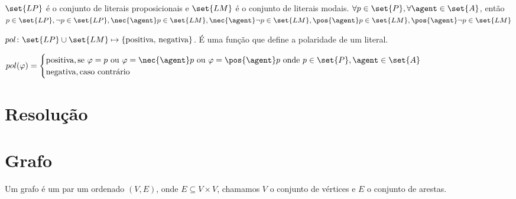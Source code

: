 
\begin{definition}
$\set{LP}$ é o conjunto de literais proposicionais e $\set{LM}$ é o conjunto de literais modais.
$\forall p \in \set{P}, \forall \agent \in \set{A}$, então $ p \in \set{LP}, \neg p \in \set{LP}, \nec{\agent} p \in \set{LM}, \nec{\agent} \neg p \in \set{LM}, \pos{\agent} p \in \set{LM}, \pos{\agent} \neg p \in \set{LM}$
\end{definition}

\begin{definition}
$pol \colon \set{LP} \cup \set{LM} \mapsto \{\text{positiva, negativa}\}$. É uma função que define a polaridade de um literal.

$pol(\varphi)=
\begin{cases}
\text{positiva},\text{se } \varphi = p \text{ ou } \varphi = \nec{\agent} p \text{ ou } \varphi = \pos{\agent} p \text{ onde } p \in \set{P}, \agent \in \set{A}\\
\text{negativa},\text{caso contrário}\\
\end{cases}$
\end{definition}

\section{Resolução}


\section{Grafo}
Um grafo é um par um ordenado $(V, E)$, onde $E \subseteq V\times V$, chamamos $V$ o conjunto de vértices e $E$ o conjunto de arestas.

